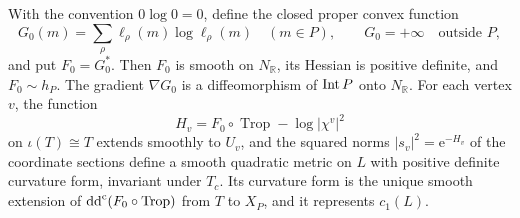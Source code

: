 \begin{theorem}\label{thm:guillemin-reference-metric}
With the convention $0\log0=0$, define the closed proper convex function
\[
 G_0(m)=\sum_\rho\ell_\rho(m)\log\ell_\rho(m)\quad(m\in P),
 \qquad G_0=+\infty\quad\text{outside }P,
\]
and put $F_0=G_0^*$. Then $F_0$ is smooth on $N_{\mathbb R}$, its Hessian is positive definite, and $F_0\sim h_P$. The gradient $\nabla G_0$ is a diffeomorphism of $\operatorname{Int} P$ onto $N_{\mathbb R}$. For each vertex $v$, the function
\[
 H_v=F_0\circ\operatorname{Trop}-\log|\chi^v|^2
\]
on $\iota(T)\cong T$ extends smoothly to $U_v$, and the squared norms $|s_v|^2=\mathrm e^{-H_v}$ of the coordinate sections define a smooth quadratic metric on $L$ with positive definite curvature form, invariant under $T_c$. Its curvature form is the unique smooth extension of $\mathrm{dd}^{\mathrm{c}}(F_0\circ\operatorname{Trop})$ from $T$ to $X_P$, and it represents $c_1(L)$.
\end{theorem}
